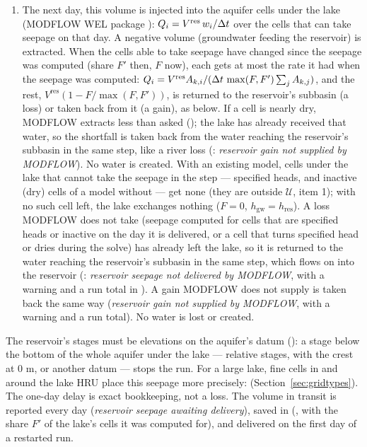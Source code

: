 \begin{enumerate}
\item The next day, this volume is injected into the aquifer cells under the lake (MODFLOW WEL package
): $Q_i=V^{\mathrm{res}}\,w_i/\Delta t$ over the cells that can take seepage on that day. A negative volume
(groundwater feeding the reservoir) is extracted. When the cells able to take seepage have changed since the seepage was
computed (share $F'$ then, $F$ now), each gets at most the rate it had when the seepage was computed:
$Q_i=V^{\mathrm{res}}A_{k,i}/(\Delta t\,\max(F,F')\sum_jA_{k,j})$, and the rest, $V^{\mathrm{res}}(1-F/\max(F,F'))$, is
returned to the reservoir's subbasin (a loss) or taken back from it (a gain), as below.
If a cell is nearly dry, MODFLOW extracts less than asked (); the lake has already received that
water, so the shortfall is taken back from the water reaching the reservoir's subbasin in the same step, like a river loss
(: \emph{reservoir gain not supplied by MODFLOW}). No water is created.
With an existing model, cells under the lake that cannot take the seepage in the step --- specified heads, and inactive
(dry) cells of a model without  --- get none (they are outside $\mathcal{U}$, item 1); with no such cell left,
the lake exchanges nothing ($F=0$, $h_{\mathrm{gw}}=h_{\mathrm{res}}$). A loss MODFLOW does not take (seepage computed for
cells that are specified heads or inactive on the day it is delivered, or a cell that turns specified head or dries during
the solve) has already left the lake, so it is returned to the water reaching the reservoir's subbasin in the same step,
which flows on into the reservoir (: \emph{reservoir seepage not delivered by MODFLOW}, with a warning and
a run total in ). A gain MODFLOW does not supply is taken back the same way (\emph{reservoir gain
not supplied by MODFLOW}, with a warning and a run total). No water is lost or created.
\end{enumerate}
The reservoir's stages must be elevations on the aquifer's datum (): a stage below the
bottom of the whole aquifer under the lake --- relative stages, with the crest at 0 m, or another datum --- stops the run.
For a large lake, fine cells in and around the lake HRU place this seepage more precisely: 
(Section~\ref{sec:gridtypes}). The one-day delay is exact bookkeeping, not a loss. The volume in transit is reported every day (\emph{reservoir seepage
awaiting delivery}), saved in  (, with the share $F'$ of the lake's cells it
was computed for), and delivered on the first day of a restarted run.

